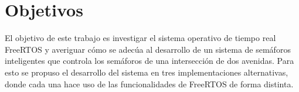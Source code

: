 \section{Objetivos}
El objetivo de este trabajo es investigar el sistema operativo de tiempo real FreeRTOS y averiguar cómo se adecúa al desarrollo de un sistema de semáforos inteligentes que controla los semáforos de una intersección de dos avenidas. Para esto se propuso el desarrollo del sistema en tres implementaciones alternativas, donde cada una hace uso de las funcionalidades de FreeRTOS de forma distinta.